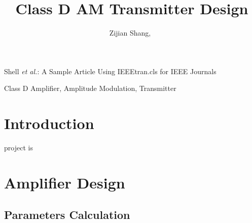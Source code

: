 \documentclass[lettersize,journal]{IEEEtran}
\begin{document}
\title{Class D AM Transmitter Design}

\author{Zijian Shang,~}

%
{Shell \MakeLowercase{\textit{et al.}}: A Sample Article Using IEEEtran.cls for IEEE Journals}



\maketitle

\begin{abstract}

\end{abstract}

\begin{IEEEkeywords}
Class D Amplifier, Amplitude Modulation, Transmitter
\end{IEEEkeywords}

\section{Introduction}
 project is 

\section{Amplifier Design}
\subsection{Parameters Calculation}
\end{document}
